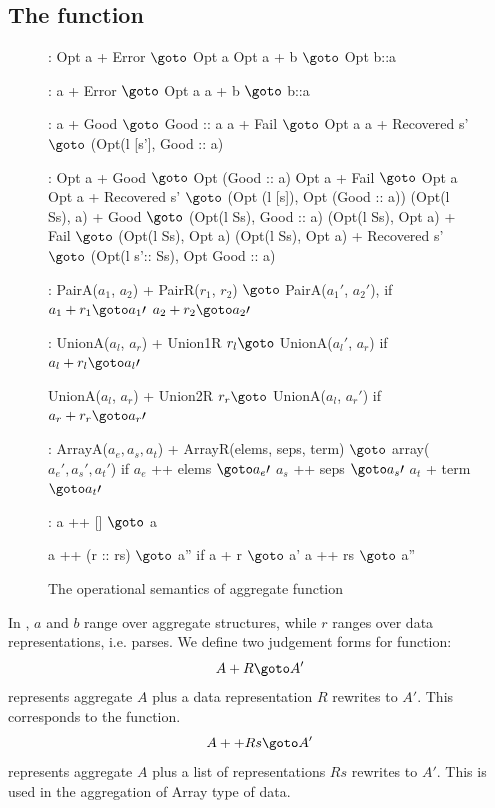\subsection{The  function}
\begin{figure}[ht]
\centering
\begin{code}
\cdmath
{}:
  Opt a + Error $\goto$ Opt a
  Opt a + b     $\goto$ Opt b::a

:
  a + Error $\goto$ Opt a
  a + b     $\goto$ b::a

: 
  a + Good $\goto$ Good :: a
  a + Fail $\goto$ Opt a
  a + Recovered s' $\goto$ (Opt(l [s'], Good :: a)

: 
  Opt a + Good $\goto$ Opt (Good :: a)
  Opt a + Fail $\goto$ Opt a
  Opt a + Recovered s' $\goto$ (Opt (l [s]), Opt (Good :: a))
  (Opt(l Ss), a) + Good $\goto$ (Opt(l Ss), Good :: a)
  (Opt(l Ss), Opt a) + Fail $\goto$ (Opt(l Ss), Opt a)
  (Opt(l Ss), Opt a) + Recovered s' $\goto$ (Opt(l s':: Ss), Opt Good :: a)

:
  PairA($a_1$, $a_2$) + PairR($r_1$, $r_2$) $\goto$ PairA($a_1\prime$, $a_2\prime$),
  if 
	$a_1 + r_1 \goto a_1\prime$
	$a_2 + r_2 \goto a_2\prime$


:
  UnionA($a_l$, $a_r$) + Union1R $r_l \goto$ UnionA($a_l\prime$, $a_r$)
  if $a_l + r_l \goto a_l\prime$

  UnionA($a_l$, $a_r$) + Union2R $r_r \goto$ UnionA($a_l$, $a_r\prime$)
  if $a_r + r_r \goto a_r\prime$


:
  ArrayA($a_e, a_s, a_t$) + ArrayR(elems, seps, term) $\goto$ array($a_e\prime, a_s\prime, a_t\prime$)
  if 
	$a_e$ ++ elems $\goto a_e\prime$
	$a_s$ ++ seps  $\goto a_s\prime$
	$a_t$ +  term  $\goto a_t\prime$

:
  a ++ [] $\goto$ a

  a ++ (r :: rs) $\goto$ a'' 
  if 
	a + r $\goto$ a'
	a ++ rs $\goto$ a''

\end{code}
\caption{The operational semantics of aggregate function}
\label{fig:aggr-sem}
\end{figure}

In , $a$ and $b$ range over aggregate structures, while
$r$ ranges over data representations, i.e. parses.
We define two judgement forms for  function:
\[A + R \goto A'\]
represents aggregate $A$ plus a data representation $R$ rewrites to $A'$.
This corresponds to the  function.
\[A ++ Rs \goto A'\]
represents aggregate $A$ plus a list of representations $Rs$ rewrites
to $A'$. This is used in the aggregation of Array type of data.

